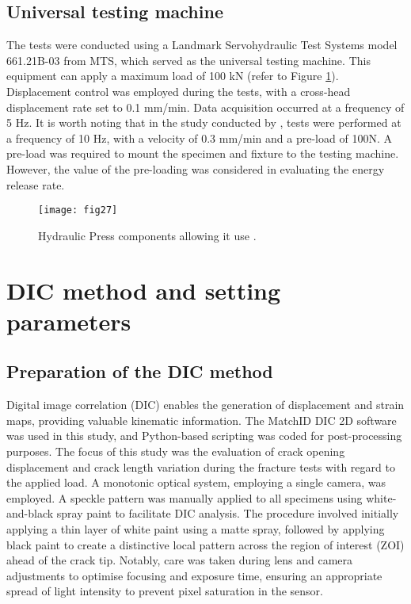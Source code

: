 \subsection{Universal testing machine}

The tests were conducted using a Landmark Servohydraulic Test Systems model 661.21B-03 from MTS, which served as the universal testing machine. This equipment can apply a maximum load of 100 kN (refer to Figure \ref{fig:fig27}). Displacement control was employed during the tests, with a cross-head displacement rate set to 0.1 mm/min. Data acquisition occurred at a frequency of 5 Hz. It is worth noting that in the study conducted by \citep{Mambili2018}, tests were performed at a frequency of 10 Hz, with a velocity of 0.3 mm/min and a pre-load of 100N. A pre-load was required to mount the specimen and fixture to the testing machine. However, the value of the pre-loading was considered in evaluating the energy release rate.

\begin{figure}[htp]
	\centering
	\texttt{[image: fig27]}
	\caption{Hydraulic Press components allowing it use \citep{MALFAIT2021}.}
	\label{fig:fig27}
\end{figure}

\section{DIC method and setting parameters}

\subsection{Preparation of the DIC method}

Digital image correlation (DIC) enables the generation of displacement and strain maps, providing valuable kinematic information. The MatchID DIC 2D software was used in this study, and Python-based scripting was coded for post-processing purposes.
The focus of this study was the evaluation of crack opening displacement and crack length variation during the fracture tests with regard to the applied load. A monotonic optical system, employing a single camera, was employed. A speckle pattern was manually applied to all specimens using white-and-black spray paint to facilitate DIC analysis. The procedure involved initially applying a thin layer of white paint using a matte spray, followed by applying black paint to create a distinctive local pattern across the region of interest (ZOI) ahead of the crack tip. Notably, care was taken during lens and camera adjustments to optimise focusing and exposure time, ensuring an appropriate spread of light intensity to prevent pixel saturation in the sensor.

